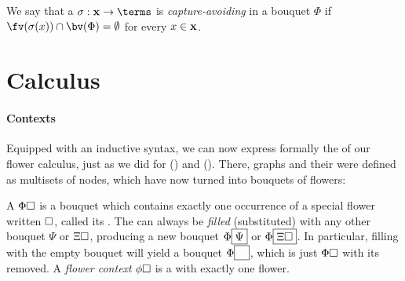 \begin{scope}
\begin{definition}
  We say that a  $\sigma : \bx \to \terms$ is
  \emph{capture-avoiding} in a bouquet $\Phi$ if $\fv(\sigma(x)) \cap \bv(\Phi)
  = \emptyset$ for every $x \in \mathbf{x}$.
\end{definition}

\section{Calculus}

\paragraph{Contexts}

Equipped with an inductive syntax, we can now express formally the  of our flower calculus, just as we did for 
() and  (). There, graphs and their
 were defined as multisets of nodes, which have now turned into bouquets
of flowers:

\begin{definition}[Context]
  A  $\Phi\square$ is a bouquet which contains exactly one
  occurrence of a special flower written $\square$, called its . The
   can always be \emph{filled} (substituted) with any other bouquet
  $\Psi$ or  $\Xi\square$, producing a new bouquet
  $\Phi\fbox{$\Psi$}$ or  $\Phi\fbox{$\Xi\square$}$. In particular,
  filling with the empty bouquet will yield a bouquet
  $\Phi\fbox{$\phantom{\Phi}$}$, which is just $\Phi\square$ with its 
  removed. A \emph{flower context} $\phi\square$ is a  with exactly one
  flower.
\end{definition}


\end{scope}
